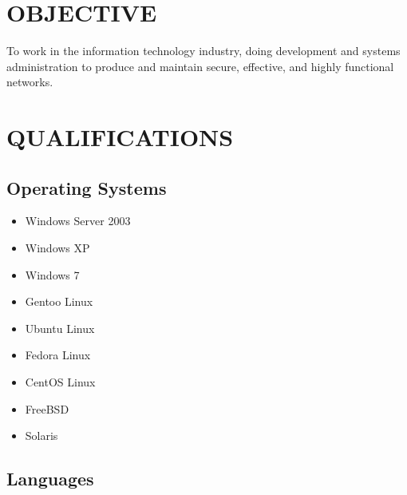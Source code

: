 \documentclass{res}
\begin{document}

\address{\bf  ADDRESS\\
    2130 S.W. Camelot Court \#11\\
    Portland, Oregon, 97225\\
    (208) - 860 - 8702\\
}

\begin{resume}

\vspace{-0.2in}

\section{OBJECTIVE}
To work in the information technology industry, doing development and systems
administration to produce and maintain secure, effective, and highly functional
networks.

\vspace{-0.1in}
\section{QUALIFICATIONS}
\vspace{-0.2in}
\subsection{Operating Systems}
\vspace{-0.2in}
\begin{multicols}{3}
  \begin{itemize}
    \item Windows Server 2003
    \item Windows XP
    \item Windows 7
    \item Gentoo Linux
    \item Ubuntu Linux
    \item Fedora Linux
    \item CentOS Linux
    \item FreeBSD
    \item Solaris
  \end{itemize}
\end{multicols}

\vspace{-0.5in}
\subsection{Languages}
\vspace{-0.2in}


\end{resume}
\end{document}
